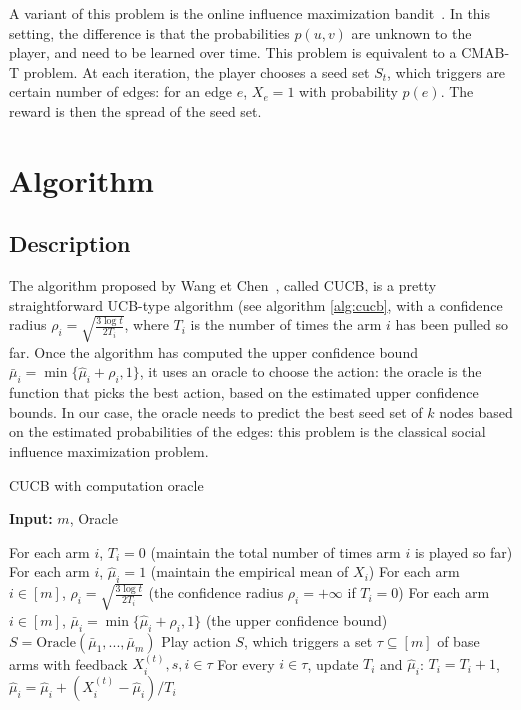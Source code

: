 \documentclass[a4paper,12pt]{article}
\begin{document}
A variant of this problem is the online influence maximization bandit~\cite{chen2016combinatorial}. In this setting, the difference is that the probabilities $p(u, v)$ are unknown to the player, and need to be learned over time. This problem is equivalent to a CMAB-T problem. At each iteration, the player chooses a seed set $S_t$, which triggers are certain number of edges: for an edge $e$, $X_e = 1$ with probability $p(e)$. The reward is then the spread of the seed set.



\section{Algorithm}
\label{scn:algo}

\subsection{Description}

The algorithm proposed by Wang et Chen~\cite{wang2017improving}, called CUCB, is a pretty straightforward UCB-type algorithm (see algorithm \ref{alg:cucb}, with a confidence radius $\rho_i = \sqrt{\frac{3\log t}{2T_i}}$, where $T_i$ is the number of times the arm $i$ has been pulled so far. Once the algorithm has computed the upper confidence bound $\bar{\mu}_i = \min\{\hat{\mu}_i + \rho_i, 1\}$, it uses an oracle to choose the action: the oracle is the function that picks the best action, based on the estimated upper confidence bounds. In our case, the oracle needs to predict the best seed set of $k$ nodes based on the estimated probabilities of the edges: this problem is the classical social influence maximization problem.


\begin{algorithm}
\caption{CUCB with computation oracle}\label{alg:cucb}
\hspace*{\algorithmicindent} \textbf{Input: } $m$, Oracle
\begin{algorithmic}[1]
\State For each arm $i$, $T_i = 0$ (maintain the total number of times arm $i$ is played so far)
\State For each arm $i$, $\hat{\mu}_i = 1$ (maintain the empirical mean of $X_i$)
\State For each arm $i\in[m]$, $\rho_i = \sqrt{\frac{3\log t}{2T_i}}$ (the confidence radius $\rho_i = +\infty$ if $T_i = 0$)
\State For each arm $i\in[m]$, $\bar{\mu}_i = \min\{\hat{\mu}_i + \rho_i, 1\}$ (the upper confidence bound)
\State $S = \text{Oracle}(\bar{\mu}_1, ..., \bar{\mu}_m)$
\State Play action $S$, which triggers a set $\tau \subseteq[m]$ of base arms with feedback $X_i^{(t)}, s, i\in\tau$
\State For every $i\in\tau$, update $T_i$ and $\hat{\mu}_i$: $T_i = T_i+1$, $\hat{\mu}_i = \hat{\mu}_i + (X_i^{(t)} - \hat{\mu}_i) / T_i$
\EndFor
\end{algorithmic}
\end{algorithm}
\end{document}
